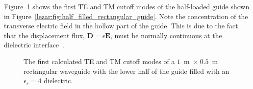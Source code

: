 Figure~\ref{lezar:fig:half_filled_rectangular_cutoff_modes} shows the first
TE and TM cutoff modes of the half-loaded guide shown in
Figure~\ref{lezar:fig:half_filled_rectangular_guide}. Note the concentration
of the transverse electric field in the hollow part of the guide. This
is due to the fact that the displacement flux, $\mathbf{D} =
\epsilon\mathbf{E}$, must be normally continuous at the dielectric
interface~\cite{Poz2005, Smi1997}.
\begin{figure}[h]
\centering
\caption{The first calculated TE and TM cutoff modes of a $1$~m~$\times~0.5$~m rectangular waveguide with the lower half of the guide filled with an $\epsilon_r = 4$ dielectric.}
\label{lezar:fig:half_filled_rectangular_cutoff_modes}
\end{figure}

